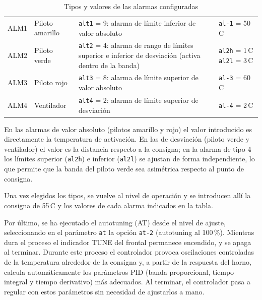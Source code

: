 \begin{table}[H]
	\centering
	\begin{tabularx}{\linewidth}{|C{1.6cm}|C{2.2cm}|Y|C{3.2cm}|}
		\hline
		 &  &  &  \\
		\hline
		ALM1 & Piloto amarillo & \texttt{alt1} = 9: alarma de límite inferior de valor absoluto & \texttt{al-1} = 50\,\textdegree C \\
		\hline
		ALM2 & Piloto verde & \texttt{alt2} = 4: alarma de rango de límites superior e inferior de desviación (activa dentro de la banda) & \texttt{al2h} = 1\,\textdegree C \newline \texttt{al2l} = 3\,\textdegree C \\
		\hline
		ALM3 & Piloto rojo & \texttt{alt3} = 8: alarma de límite superior de valor absoluto & \texttt{al-3} = 60\,\textdegree C \\
		\hline
		ALM4 & Ventilador & \texttt{alt4} = 2: alarma de límite superior de desviación & \texttt{al-4} = 2\,\textdegree C \\
		\hline
	\end{tabularx}
	\caption{Tipos y valores de las alarmas configuradas}
\end{table}

En las alarmas de valor absoluto (pilotos amarillo y rojo) el valor introducido es directamente la temperatura de activación. En las de desviación (piloto verde y ventilador) el valor es la distancia respecto a la consigna; en la alarma de tipo 4 los límites superior (\texttt{al2h}) e inferior (\texttt{al2l}) se ajustan de forma independiente, lo que permite que la banda del piloto verde sea asimétrica respecto al punto de consigna.

Una vez elegidos los tipos, se vuelve al nivel de operación y se introducen allí la consigna de 55\,\textdegree C y los valores de cada alarma indicados en la tabla.


Por último, se ha ejecutado el autotuning (AT) desde el nivel de ajuste, seleccionando en el parámetro \texttt{at} la opción \texttt{at-2} (autotuning al 100\,\%). Mientras dura el proceso el indicador TUNE del frontal permanece encendido, y se apaga al terminar. Durante este proceso el controlador provoca oscilaciones controladas de la temperatura alrededor de la consigna y, a partir de la respuesta del horno, calcula automáticamente los parámetros PID (banda proporcional, tiempo integral y tiempo derivativo) más adecuados. Al terminar, el controlador pasa a regular con estos parámetros sin necesidad de ajustarlos a mano.

